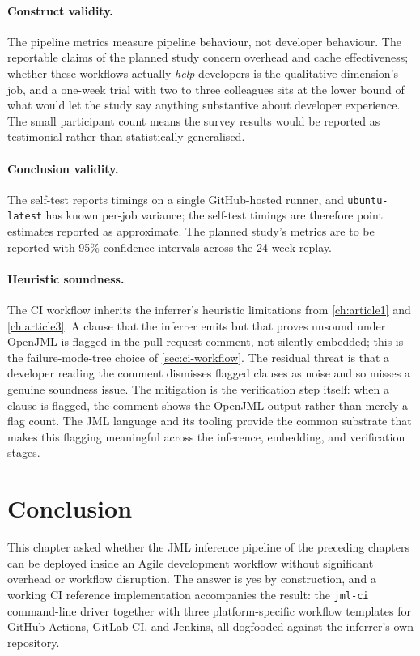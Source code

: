 \paragraph{Construct validity.} The pipeline metrics measure pipeline behaviour,
not developer behaviour. The reportable claims of the planned study concern
overhead and cache effectiveness; whether these workflows actually \emph{help}
developers is the qualitative dimension's job, and a one-week trial with two to
three colleagues sits at the lower bound of what would let the study say anything
substantive about developer experience. The small participant count means the
survey results would be reported as testimonial rather than statistically
generalised.

\paragraph{Conclusion validity.} The self-test reports timings on a single
GitHub-hosted runner, and \texttt{ubuntu-latest} has known per-job variance; the
self-test timings are therefore point estimates reported as approximate. The
planned study's metrics are to be reported with 95\% confidence intervals across
the 24-week replay.

\paragraph{Heuristic soundness.} The CI workflow inherits the inferrer's
heuristic limitations from \cref{ch:article1} and \cref{ch:article3}. A clause
that the inferrer emits but that proves unsound under OpenJML is flagged in the
pull-request comment, not silently embedded; this is the failure-mode-tree choice
of \cref{sec:ci-workflow}. The residual threat is that a developer reading the
comment dismisses flagged clauses as noise and so misses a genuine soundness
issue. The mitigation is the verification step itself: when a clause is flagged,
the comment shows the OpenJML output rather than merely a flag count. The JML
language and its tooling \citep{leavens2006jml} provide the common substrate that
makes this flagging meaningful across the inference, embedding, and verification
stages.

\section{Conclusion}
\label{sec:ci-conclusion}

This chapter asked whether the JML inference pipeline of the preceding chapters
can be deployed inside an Agile development workflow without significant overhead
or workflow disruption. The answer is yes by construction, and a working CI
reference implementation accompanies the result: the \texttt{jml-ci}
command-line driver together with three platform-specific workflow templates for
GitHub Actions, GitLab CI, and Jenkins, all dogfooded against the inferrer's own
repository.

